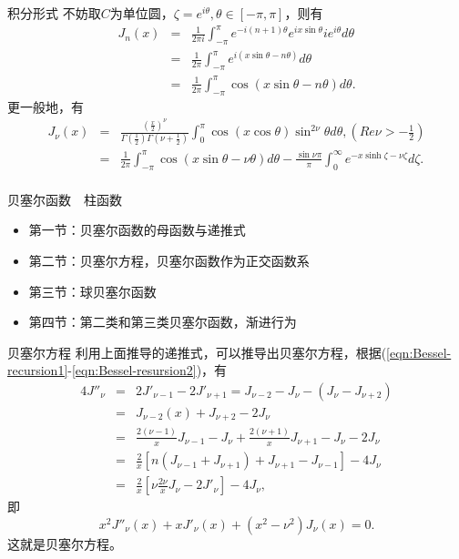 \documentclass[11pt]{beamer}
\begin{document}
\begin{frame}{积分形式}
不妨取$C$为单位圆，$\zeta = e^{i\theta}, \theta \in [-\pi, \pi]$，则有
\begin{eqnarray}
J_n(x) &=& \frac{1}{2\pi i} \int^\pi_{-\pi} e^{-i(n+1)\theta} e^{ix\sin\theta} ie^{i\theta} d\theta
\nonumber\\
&=& \frac{1}{2\pi} \int^\pi_{-\pi} e^{i(x\sin\theta - n\theta)} d \theta
\nonumber\\
&=& \frac{1}{2\pi} \int^\pi_{-\pi} \cos( x\sin\theta - n \theta ) d \theta.
\end{eqnarray}
更一般地，有
\begin{eqnarray}
J_\nu(x) &=& \frac{(\frac{x}{2})^\nu}{\Gamma(\frac{1}{2}) \Gamma(\nu+\frac{1}{2})}
\int^\pi_0 \cos(x\cos \theta) \sin^{2\nu} \theta d\theta, (Re \nu > - \frac{1}{2})
\nonumber\\
&=& \frac{1}{2\pi} \int^\pi_{-\pi} \cos( x \sin \theta - \nu \theta ) d\theta
-
\frac{\sin \nu \pi}{\pi} \int^\infty_0 e^{-x\sinh \zeta - \nu \zeta} d\zeta.
\nonumber\\
\end{eqnarray}
\end{frame}

\begin{frame}{贝塞尔函数　柱函数}
\begin{itemize}
	\item {第一节：贝塞尔函数的母函数与递推式}
	\vspace{1cm}
	\item {\color{blue}第二节：贝塞尔方程，贝塞尔函数作为正交函数系}
	\vspace{1cm}
	\item 第三节：球贝塞尔函数
	\vspace{1cm}
	\item 第四节：第二类和第三类贝塞尔函数，渐进行为
\end{itemize}
\end{frame}

\begin{frame}{贝塞尔方程}
利用上面推导的递推式，可以推导出贝塞尔方程，根据(\ref{eqn:Bessel-recursion1}-\ref{eqn:Bessel-resursion2})，有
\begin{eqnarray}
4 J''_\nu &=& 2J'_{\nu-1} - 2J'_{\nu+1}
= J_{\nu-2} - J_\nu - ( J_\nu - J_{\nu+2} )
\nonumber\\
&=& J_{\nu-2}(x) + J_{\nu+2} - 2 J_\nu
\nonumber\\
&=& \frac{2(\nu-1)}{x} J_{\nu-1} - J_\nu + \frac{2(\nu+1)}{x}J_{\nu+1} - J_\nu - 2 J_\nu
\nonumber\\
&=& \frac{2}{x}[n(J_{\nu-1} + J_{\nu+1}) + J_{\nu+1} - J_{\nu-1} ] - 4 J_\nu
\nonumber\\
&=& \frac{2}{x}[ \nu \frac{2\nu}{x} J_\nu - 2 J'_\nu ] - 4 J_\nu,
\end{eqnarray}
即
\begin{equation}
x^2 J''_\nu(x) + x J'_\nu(x) + (x^2 - \nu^2) J_\nu(x) = 0.
\end{equation}
这就是贝塞尔方程。
\end{frame}
\end{document}
